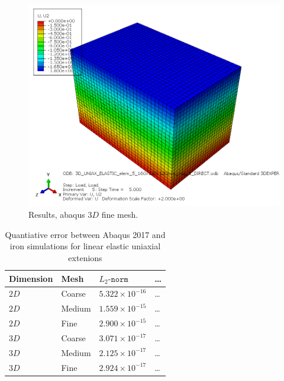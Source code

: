 \begin{figure}[h!]
    \centering 
    \includegraphics[width=\columnwidth]{examples/example-0101/doc/figures/3D_UNIAX_ELASTIC_elem_5_160x120x120mm_intp_1_DIRECTU2.png} 
    \caption{Results, abaqus $3D$ fine mesh.}
    \label{example-0101-abaqus-3D-fig}
\end{figure}
%
\begin{table}[h]
	\centering
    \begin{tabular}{llll}
    Dimension & Mesh 		& $L_2\texttt{-norm}$			& \ldots \\ \hline
    $2D$      & Coarse 	& $5.322\times 10^{-16}$	& \ldots \\
    $2D$      & Medium  & $1.559\times 10^{-15}$	& \ldots \\
    $2D$      & Fine  	& $2.900\times 10^{-15}$		& \ldots \\
    $3D$      & Coarse  & $3.071\times 10^{-17}$	& \ldots \\
    $3D$      & Medium  & $2.125\times 10^{-17}$	& \ldots \\
		$3D$			&	Fine 		&	$2.924\times 10^{-17}$	& \ldots 
    \end{tabular}
		\caption{Quantiative error between Abaqus 2017 and iron simulations for linear elastic uniaxial extenions}
		\label{tab:example-0101-valid-Iron-Abaqus}
\end{table}
